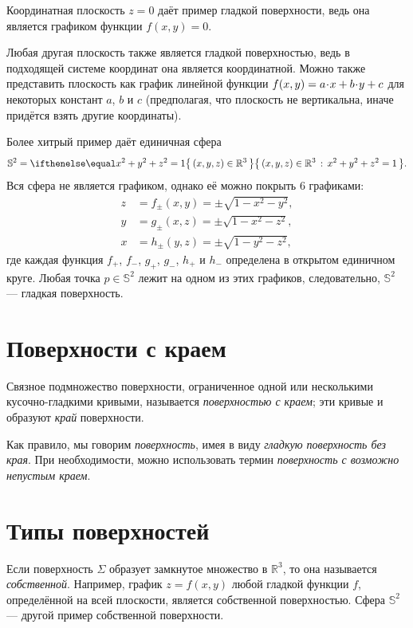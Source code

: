 Координатная плоскость $z=0$ даёт пример гладкой поверхности, ведь она является графиком функции $f(x,y)=0$.

Любая другая плоскость также является гладкой поверхностью, ведь в подходящей системе координат  она является координатной.
Можно также представить плоскость как график линейной функции 
$f(x,y)\z=a\cdot x+b\cdot y+c$ для некоторых констант $a$, $b$ и $c$
(предполагая, что плоскость не вертикальна, иначе придётся взять другие координаты).

Более хитрый пример даёт единичная сфера 
\[\mathbb{S}^2=\set{(x,y,z)\in\mathbb{R}^3}{x^2+y^2+z^2=1}.\]
Вся сфера не является графиком,
однако её можно покрыть $6$ графиками:
\begin{align*}
z&=f_\pm(x,y)=\pm \sqrt{1-x^2-y^2},
\\
y&=g_\pm(x,z)=\pm \sqrt{1-x^2-z^2},
\\
x&=h_\pm(y,z)=\pm \sqrt{1-y^2-z^2},
\end{align*}
где каждая функция $f_+$, $f_-$, $g_+$, $g_-$, $h_+$ и $h_-$ определена в открытом единичном круге.
Любая точка $p\in\mathbb{S}^2$ лежит на одном из этих графиков, следовательно, $\mathbb{S}^2$ --- гладкая  поверхность.

\section{Поверхности с краем}

{\sloppy

Связное подмножество поверхности, ограниченное одной или несколькими кусочно-гладкими кривыми, называется \emph{поверхностью с краем}; эти кривые и образуют \emph{край} поверхности.

}

Как правило, мы говорим {}\emph{поверхность}, имея в виду {}\emph{гладкую поверхность без края}.
При необходимости, можно использовать термин {}\emph{поверхность с возможно непустым краем}.


\section{Типы поверхностей}

Если поверхность $\Sigma$ образует замкнутое множество в $\mathbb{R}^3$, то она называется \emph{собственной}.
Например, график $z=f(x,y)$ любой гладкой функции $f$, определённой на всей плоскости, является собственной поверхностью.
Сфера $\mathbb{S}^2$ --- другой пример собственной поверхности.

